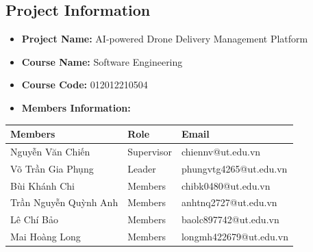 \subsection{Project Information}

\begin{itemize}
  \item \textbf{Project Name:} AI-powered Drone Delivery Management Platform
  \item \textbf{Course Name:} Software Engineering
  \item \textbf{Course Code:} 012012210504
  \item \textbf{Members Information:}
\end{itemize}

\begin{longtable}{@{}lll@{}}
\toprule
\textbf{Members} & \textbf{Role} & \textbf{Email} \\
\midrule
\endhead
Nguyễn Văn Chiến & Supervisor & chiennv@ut.edu.vn \\
Võ Trần Gia Phụng & Leader & phungvtg4265@ut.edu.vn \\
Bùi Khánh Chi & Members & chibk0480@ut.edu.vn \\
Trần Nguyễn Quỳnh Anh & Members & anhtnq2727@ut.edu.vn \\
Lê Chí Bảo & Members & baolc897742@ut.edu.vn \\
Mai Hoàng Long & Members & longmh422679@ut.edu.vn \\
\bottomrule
\end{longtable}
